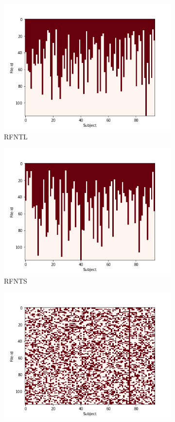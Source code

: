 \documentclass[10pt, conference, compsocconf]{IEEEtran}
\begin{document}
\begin{figure}[h!]
\begin{subfigure}[b]{0.45\columnwidth}
                  \includegraphics[width=\columnwidth]{figures/5vs7_RFNT-L_04_training}
                  \caption{RFNTL}
                  \label{fig:triangular-L-Sample-Training-set}
        \end{subfigure}
        \begin{subfigure}[b]{0.45\columnwidth}
                  \includegraphics[width=\columnwidth]{figures/5vs7_RFNT-S_04_training}
                  \caption{RFNTS}
                  \label{fig:triangular-S-Sample-Training-set}
        \end{subfigure}
        \begin{subfigure}[b]{\columnwidth}
        \centering
        \includegraphics[width=0.45\columnwidth]{figures/5vs7_random-unreal_04_training}

\end{subfigure}
\end{figure}
\end{document}
